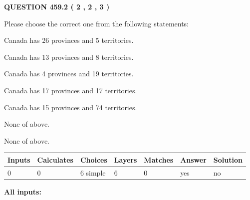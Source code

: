 \documentclass[12pt]{article}
\begin{document}
   
  
\vspace{0.2in}
  
{\textbf{\Large{QUESTION
459.2 
 ( 2 , 2 , 3 )
}}}
  
  
Please choose the correct one from the following statements:
 
 
Canada has  26 provinces and  5 territories.
 
 
Canada has  13 provinces and  8 territories.
 
 
Canada has   4 provinces and  19 territories.
 
 
Canada has  17 provinces and  17 territories.
 
 
Canada has  15 provinces and  74 territories.
 
 
 None of above.
 
 
\noindent{}
 
 
 None of above.
 
 
\noindent{}
 
 
   
   
   
   
\noindent\begin{tabular}{|l|l|l|l|l|l|l|}
 \hline
Inputs & Calculates & Choices & Layers & Matches & Answer & Solution \\ \hline
 0  & 
 0  & 
 6
  simple  
  & 
 6  & 
 0  & 
  yes & 
  no 
  \\ \hline
 \end{tabular}
   
   
   
   
\noindent{}
   
   
   
   
\noindent\vspace{0.1in}\hspace{-0.08in} {\textbf{\Large{All inputs: }}}
   
   
   
   
   
   
 \vspace{0.2in}
 
\end{document}
